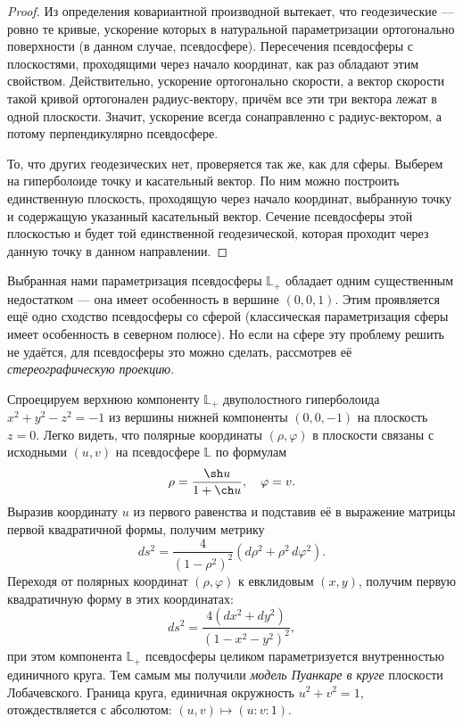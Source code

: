 \begin{proof}
	Из определения ковариантной производной вытекает, что геодезические --- ровно те кривые, ускорение которых в натуральной параметризации ортогонально поверхности (в данном случае, псевдосфере). Пересечения псевдосферы с плоскостями, проходящими через начало координат, как раз обладают этим свойством. Действительно, ускорение ортогонально скорости, а вектор скорости такой кривой ортогонален радиус-вектору, причём все эти три вектора лежат в одной плоскости. Значит, ускорение всегда сонаправленно с радиус-вектором, а потому перпендикулярно псевдосфере.

	То, что других геодезических нет, проверяется так же, как для сферы. Выберем на гиперболоиде точку и касательный вектор. По ним можно построить единственную плоскость, проходящую через начало координат, выбранную точку и содержащую указанный касательный вектор. Сечение псевдосферы этой плоскостью и будет той единственной геодезической, которая проходит через данную точку в данном направлении.
\end{proof}

Выбранная нами параметризация псевдосферы $\mathbb{L}_+$ обладает одним существенным недостатком --- она имеет особенность в вершине $(0, 0, 1)$. Этим проявляется ещё одно сходство псевдосферы со сферой (классическая параметризация сферы имеет особенность в северном полюсе). Но если на сфере эту проблему решить не удаётся, для псевдосферы это можно сделать, рассмотрев её \textit{стереографическую проекцию}.

Спроецируем верхнюю компоненту $\mathbb{L}_+$ двуполостного гиперболоида $x^2 + y^2 - z^2 = -1$ из вершины нижней компоненты $(0, 0, -1)$ на плоскость $z = 0$. Легко видеть, что полярные координаты $(\rho, \varphi)$ в плоскости связаны с исходными $(u, v)$ на псевдосфере $\mathbb{L}$ по формулам
\begin{equation} \label{eq:PolarProjection}
	\rho = \frac{\sh u}{1 + \ch u},\quad\varphi = v.
\end{equation}
Выразив координату $u$ из первого равенства и подставив её в выражение матрицы первой квадратичной формы, получим метрику
\[
	ds^2 = \frac{4}{(1 - \rho^2)^2}(d\rho^2 + \rho^2\,d\varphi^2).
\]
Переходя от полярных координат $(\rho, \varphi)$ к евклидовым $(x, y)$, получим первую квадратичную форму в этих координатах:
\begin{equation} \label{eq:PoincareMetrics}
	ds^2 = \frac{4(dx^2 + dy^2)}{(1 - x^2 - y^2)^2},
\end{equation}
при этом компонента $\mathbb{L}_+$ псевдосферы целиком параметризуется внутренностью единичного круга. Тем самым мы получили \textit{модель Пуанкаре в круге} плоскости Лобачевского. Граница круга, единичная окружность $u^2 + v^2 = 1$, отождествляется с абсолютом: $(u, v) \mapsto (u : v : 1)$.

